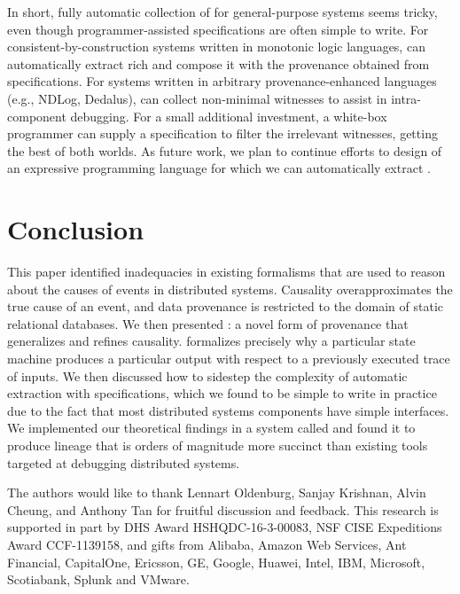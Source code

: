 In short, fully automatic collection of \watprovenance{} for general-purpose
systems seems tricky, even though programmer-assisted \watprovenance{} specifications
are often simple to write.  For consistent-by-construction systems written in
monotonic logic languages, \fluent{} can automatically extract rich
\watprovenance{} and compose it with the provenance obtained from
\watprovenance{} specifications.  For systems written in arbitrary
provenance-enhanced languages (e.g., NDLog, Dedalus), \fluent{} can collect
non-minimal witnesses to assist in intra-component debugging. For a small
additional investment, a white-box programmer can supply a \watprovenance{} specification
to filter the irrelevant witnesses, getting the best of both worlds.  As future
work, we plan to continue efforts to design of an expressive programming
language for which we can automatically extract \watprovenance{} .


\section{Conclusion}
This paper identified inadequacies in existing formalisms that are used to
reason about the causes of events in distributed systems. Causality
overapproximates the true cause of an event, and data provenance is restricted
to the domain of static relational databases.  We then presented
\watprovenance{}: a novel form of provenance that generalizes \whyprovenance{}
and refines causality. \Watprovenance{} formalizes precisely why a particular
state machine produces a particular output with respect to a previously
executed trace of inputs. We then discussed how to sidestep the complexity of
automatic \watprovenance{} extraction with \watprovenance{} specifications,
which we found to be simple to write in practice due to the fact that most
distributed systems components have simple interfaces. We implemented our
theoretical findings in a system called \fluent{} and found it to produce
lineage that is orders of magnitude more succinct than existing tools targeted
at debugging distributed systems.

\begin{acks}
  The authors would like to thank Lennart Oldenburg, Sanjay Krishnan, Alvin
  Cheung, and Anthony Tan for fruitful discussion and feedback.
  This research is supported in part by DHS Award HSHQDC-16-3-00083, NSF CISE
  Expeditions Award CCF-1139158, and gifts from Alibaba, Amazon Web Services, Ant
  Financial, CapitalOne, Ericsson, GE, Google, Huawei, Intel, IBM, Microsoft,
  Scotiabank, Splunk and VMware.
\end{acks}
